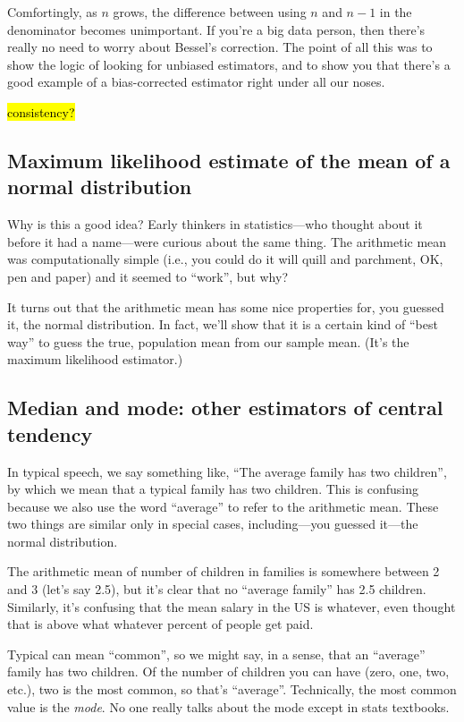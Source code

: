 Comfortingly, as $n$ grows, the difference between using $n$ and $n-1$ in the
denominator becomes unimportant. If you're a big data person, then there's
really no need to worry about Bessel's correction. The point of all this was
to show the logic of looking for unbiased estimators, and to show you that
there's a good example of a bias-corrected estimator right under all our
noses.

\hl{consistency?}

\subsection{Maximum likelihood estimate of the mean of a normal distribution}

Why is this a good idea? Early thinkers in statistics---who thought
about it before it had a name---were curious about the same thing. The
arithmetic mean was computationally simple (i.e., you could do it will
quill and parchment, OK, pen and paper) and it seemed to ``work'', but
why?

It turns out that the arithmetic mean has some nice properties for, you
guessed it, the normal distribution. In fact, we'll show that it is a
certain kind of ``best way'' to guess the true, population mean from our
sample mean. (It's the maximum likelihood estimator.)

\subsection{Median and mode: other estimators of central tendency}

In typical speech, we say something like, ``The average family has two
children'', by which we mean that a typical family has two children.
This is confusing because we also use the word ``average'' to refer to
the arithmetic mean. These two things are similar only in special cases,
including---you guessed it---the normal distribution.

The arithmetic mean of number of children in families is somewhere
between 2 and 3 (let's say 2.5), but it's clear that no ``average
family'' has 2.5 children. Similarly, it's confusing that the mean
salary in the US is whatever, even thought that is above what whatever
percent of people get paid.

Typical can mean ``common'', so we might say, in a sense, that an
``average'' family has two children. Of the number of children you can
have (zero, one, two, etc.), two is the most common, so that's
``average''. Technically, the most common value is the \emph{mode}. No
one really talks about the mode except in stats textbooks.

